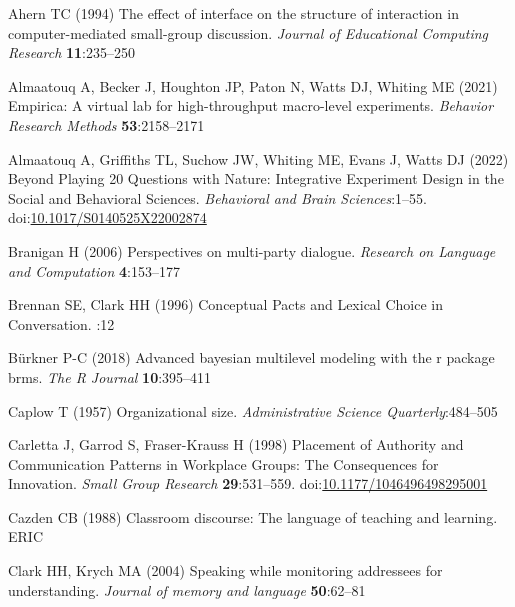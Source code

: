 \documentclass[
  english,
]{article}
\newlength{\cslhangindent}
\newlength{\cslentryspacingunit} %
\newenvironment{CSLReferences}[2] %
 {%
  \setlength{\parindent}{0pt}
  \ifodd #1
  \let\oldpar\par
  \def\par{\hangindent=\cslhangindent\oldpar}
  \fi
  \setlength{\parskip}{#2\cslentryspacingunit}
 }%
 {}
\begin{document}
\hypertarget{refs}{}
\begin{CSLReferences}{1}{0}
\leavevmode{}%
Ahern TC (1994) The effect of interface on the structure of interaction in computer-mediated small-group discussion. \emph{Journal of Educational Computing Research} \textbf{11}:235--250

\leavevmode{}%
Almaatouq A, Becker J, Houghton JP, Paton N, Watts DJ, Whiting ME (2021) Empirica: A virtual lab for high-throughput macro-level experiments. \emph{Behavior Research Methods} \textbf{53}:2158--2171

\leavevmode{}%
Almaatouq A, Griffiths TL, Suchow JW, Whiting ME, Evans J, Watts DJ (2022) Beyond {Playing} 20 {Questions} with {Nature}: {Integrative Experiment Design} in the {Social} and {Behavioral Sciences}. \emph{Behavioral and Brain Sciences}:1--55. doi:\href{https://doi.org/10.1017/S0140525X22002874}{10.1017/S0140525X22002874}

\leavevmode{}%
Branigan H (2006) Perspectives on multi-party dialogue. \emph{Research on Language and Computation} \textbf{4}:153--177

\leavevmode{}%
Brennan SE, Clark HH (1996) Conceptual {Pacts} and {Lexical Choice} in {Conversation}. :12

\leavevmode{}%
Bürkner P-C (2018) Advanced bayesian multilevel modeling with the r package brms. \emph{The R Journal} \textbf{10}:395--411

\leavevmode{}%
Caplow T (1957) Organizational size. \emph{Administrative Science Quarterly}:484--505

\leavevmode{}%
Carletta J, Garrod S, Fraser-Krauss H (1998) Placement of {Authority} and {Communication Patterns} in {Workplace Groups}: {The Consequences} for {Innovation}. \emph{Small Group Research} \textbf{29}:531--559. doi:\href{https://doi.org/10.1177/1046496498295001}{10.1177/1046496498295001}

\leavevmode{}%
Cazden CB (1988) Classroom discourse: The language of teaching and learning. ERIC

\leavevmode{}%
Clark HH, Krych MA (2004) Speaking while monitoring addressees for understanding. \emph{Journal of memory and language} \textbf{50}:62--81


\end{CSLReferences}
\end{document}
